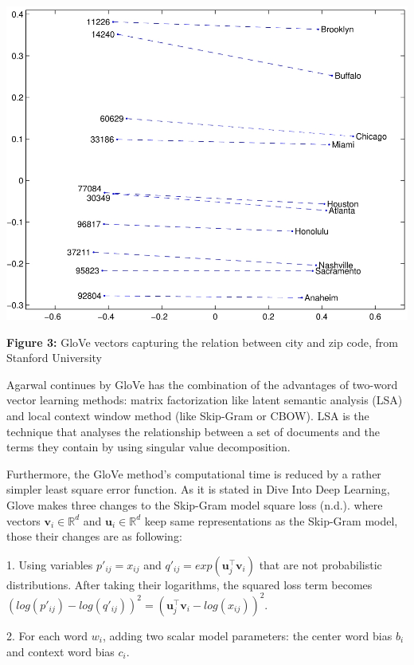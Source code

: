 \documentclass[man]{apa7}
\begin{document}
\begin{center}
\includegraphics[scale=3]{city_zip.jpg}

\textbf{Figure 3:} GloVe vectors capturing the relation between city and zip code, from Stanford University\\[2\baselineskip]

\end{center}

Agarwal continues by GloVe has the combination of the advantages of two-word vector learning methods: matrix factorization like latent semantic analysis (LSA) and local context window method (like Skip-Gram or CBOW). LSA is the technique that analyses the relationship between a set of documents and the terms they contain by using singular value decomposition. 

Furthermore, the GloVe method's computational time is reduced by a rather simpler least square error function. As it is stated in Dive Into Deep Learning, Glove makes three changes to the Skip-Gram model square loss (n.d.). where vectors $\mathbf{v_\mathit{i}} \in \mathbb{R}^d$ and $\mathbf{u_\mathit{i}} \in \mathbb{R}^d$ keep same representations as the Skip-Gram model, those their changes are as following:

1. Using variables $p'_{ij} = x_{ij}$ and $q'_{ij} = exp(\mathbf{u}_j^\top \mathbf{v}_i)$ that are not probabilistic distributions. After taking their logarithms, the squared loss term becomes $(log(p'_{ij})-log(q'_{ij}))^2 = (\mathbf{u}_j^\top \mathbf{v}_i - log (x_{ij}))^2$.

2. For each word $w_i$, adding two scalar model parameters: the center word bias $b_i$ and context word bias $c_i$.
\end{document}
